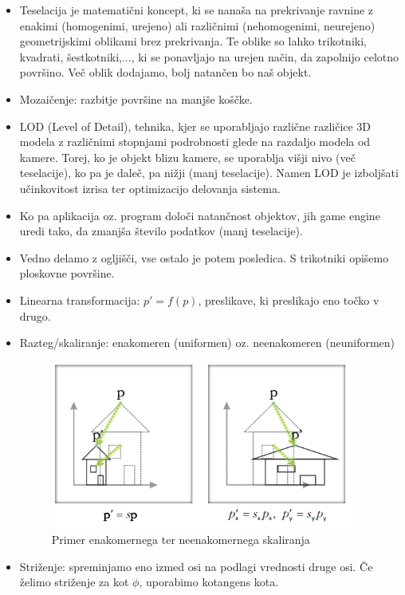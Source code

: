 \documentclass{article}
\begin{document}
\begin{itemize}
    \item Teselacija je matematični koncept, ki se nanaša na prekrivanje ravnine z enakimi (homogenimi, urejeno) ali različnimi (nehomogenimi, neurejeno) geometrijskimi oblikami brez prekrivanja. Te oblike so lahko trikotniki, kvadrati, šestkotniki,..., ki se ponavljajo na urejen način, da zapolnijo celotno površino. Več oblik dodajamo, bolj natančen bo naš objekt. 
    \item Mozaičenje: razbitje površine na manjše koščke.
    \item LOD (Level of Detail), tehnika, kjer se uporabljajo različne različice 3D modela z različnimi stopnjami podrobnosti glede na razdaljo modela od kamere. Torej, ko je objekt blizu kamere, se uporablja višji nivo (več teselacije), ko pa je daleč, pa nižji (manj teselacije). Namen LOD je izboljšati učinkovitost izrisa ter optimizacijo delovanja sistema. 
    \item Ko pa aplikacija oz. program določi natančnost objektov, jih game engine uredi tako, da zmanjša število podatkov (manj teselacije).
    \item Vedno delamo z ogljišči, vse ostalo je potem posledica. S trikotniki opišemo ploskovne površine. 
    \item Linearna transformacija: $p' = f(p)$, preslikave, ki preslikajo eno točko v drugo.
    \item Razteg/skaliranje: enakomeren (uniformen) oz. neenakomeren (neuniformen)
    \begin{figure}[H]
    \centering
    \includegraphics[width=100mm]{src/razteg_skaliranje.png}
    \caption{Primer enakomernega ter neenakomernega skaliranja}
    \end{figure}
    \item Striženje: spreminjamo eno izmed osi  na podlagi vrednosti druge osi. Če želimo striženje za kot $\phi$, uporabimo kotangens kota.
    \begin{figure}[H]

\end{figure}
\end{itemize}
\end{document}
